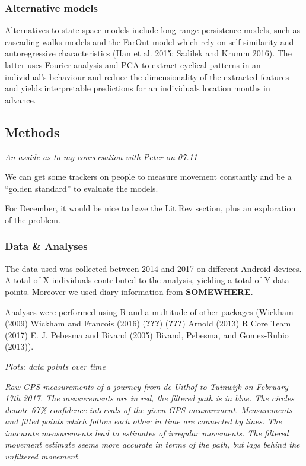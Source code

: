 \documentclass[]{article}
\begin{document}
\subsubsection{Alternative models}\label{alternative-models}

Alternatives to state space models include long range-persistence
models, such as cascading walks models and the FarOut model which rely
on self-similarity and autoregressive characteristics (Han et al. 2015;
Sadilek and Krumm 2016). The latter uses Fourier analysis and PCA to
extract cyclical patterns in an individual's behaviour and reduce the
dimensionality of the extracted features and yields interpretable
predictions for an individuals location months in advance.

\subsection{Methods}\label{methods}

\emph{An asside as to my conversation with Peter on 07.11}

We can get some trackers on people to measure movement constantly and be
a ``golden standard'' to evaluate the models.

For December, it would be nice to have the Lit Rev section, plus an
exploration of the problem.

\subsubsection{Data \& Analyses}\label{data-analyses}

The data used was collected between 2014 and 2017 on different Android
devices. A total of X individuals contributed to the analysis, yielding
a total of Y data points. Moreover we used diary information from
\textbf{SOMEWHERE}.

Analyses were performed using R and a multitude of other packages
(Wickham (2009) Wickham and Francois (2016) ({\textbf{???}})
({\textbf{???}}) Arnold (2013) R Core Team (2017) E. J. Pebesma and
Bivand (2005) Bivand, Pebesma, and Gomez-Rubio (2013)).

\emph{Plots: data points over time}

\emph{Raw GPS measurements of a journey from de Uithof to Tuinwijk on
February 17th 2017. The measurements are in red, the filtered path is in
blue. The circles denote 67\% confidence intervals of the given GPS
measurement. Measurements and fitted points which follow each other in
time are connected by lines. The inacurate measurements lead to
estimates of irregular movements. The filtered movement estimate seems
more accurate in terms of the path, but lags behind the unfiltered
movement.}
\end{document}
